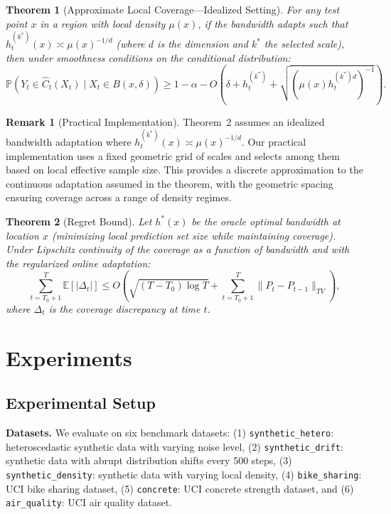 \documentclass{article}
\newtheorem{theorem}{Theorem}
\theoremstyle{definition}
\newtheorem{remark}{Remark}
\begin{document}
\begin{theorem}[Approximate Local Coverage---Idealized Setting]
For any test point $x$ in a region with local density $\mu(x)$, if the bandwidth adapts such that $h_t^{(k^*)}(x) \asymp \mu(x)^{-1/d}$ (where $d$ is the dimension and $k^*$ the selected scale), then under smoothness conditions on the conditional distribution:
\begin{equation}
\mathbb{P}(Y_t \in \hat{C}_t(X_t) \mid X_t \in B(x, \delta)) \geq 1 - \alpha - O(\delta + h_t^{(k^*)} + \sqrt{(\mu(x) h_t^{(k^*)d})^{-1}}).
\end{equation}
\end{theorem}

\begin{remark}[Practical Implementation]
Theorem~2 assumes an idealized bandwidth adaptation where $h_t^{(k^*)}(x) \asymp \mu(x)^{-1/d}$. Our practical implementation uses a fixed geometric grid of scales and selects among them based on local effective sample size. This provides a discrete approximation to the continuous adaptation assumed in the theorem, with the geometric spacing ensuring coverage across a range of density regimes.
\end{remark}

\begin{theorem}[Regret Bound]
Let $h^*(x)$ be the oracle optimal bandwidth at location $x$ (minimizing local prediction set size while maintaining coverage). Under Lipschitz continuity of the coverage as a function of bandwidth and with the regularized online adaptation:
\begin{equation}
\sum_{t=T_0+1}^{T} \mathbb{E}[|\Delta_t|] \leq O(\sqrt{(T-T_0)\log T} + \sum_{t=T_0+1}^{T} \|P_t - P_{t-1}\|_{TV}),
\end{equation}
where $\Delta_t$ is the coverage discrepancy at time $t$.
\end{theorem}

\section{Experiments}

\subsection{Experimental Setup}

\textbf{Datasets.} We evaluate on six benchmark datasets: (1) \texttt{synthetic\_hetero}: heteroscedastic synthetic data with varying noise level, (2) \texttt{synthetic\_drift}: synthetic data with abrupt distribution shifts every 500 steps, (3) \texttt{synthetic\_density}: synthetic data with varying local density, (4) \texttt{bike\_sharing}: UCI bike sharing dataset, (5) \texttt{concrete}: UCI concrete strength dataset, and (6) \texttt{air\_quality}: UCI air quality dataset.
\end{document}
